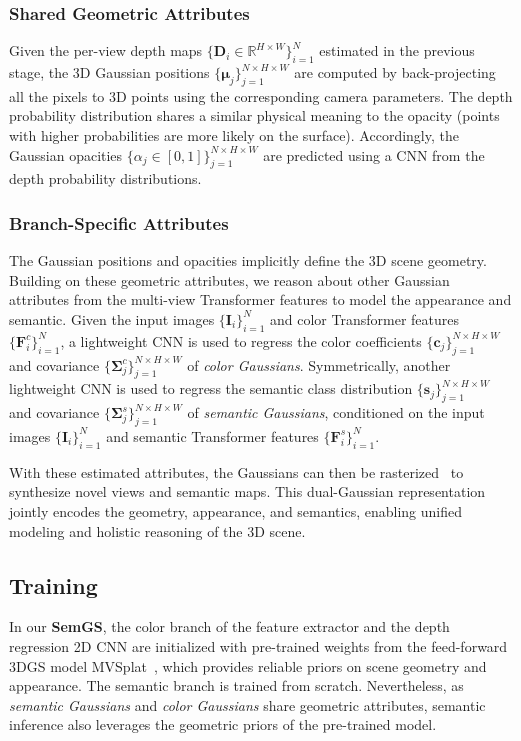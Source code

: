 \documentclass[letterpaper, 10 pt, conference]{ieeeconf}  %
\begin{document}
\subsubsection{Shared Geometric Attributes}
Given the per-view depth maps $\{\mathbf{D}_i \in \mathbb{R}^{H \times W} \}_{i=1}^N$ estimated in the previous stage, the 3D Gaussian positions $\{\bm{\mu}_j\}_{j=1}^{N \times H \times W}$ are computed by back-projecting all the pixels to 3D points using the corresponding camera parameters.
The depth probability distribution shares a similar physical meaning to the opacity (points with higher probabilities are more likely on the surface). Accordingly, the Gaussian opacities $\{\alpha_j \in [0,1]\}_{j=1}^{N \times H \times W}$ are predicted using a CNN from the depth probability distributions.

\subsubsection{Branch-Specific Attributes}
The Gaussian positions and opacities implicitly define the 3D scene geometry. Building on these geometric attributes, we reason about other Gaussian attributes from the multi-view Transformer features to model the appearance and semantic.
Given the input images $\{\mathbf{I}_i\}_{i=1}^N$ and color Transformer features $\{\mathbf{F}^c_i\}_{i=1}^N$, a lightweight CNN is used to regress the color coefficients $\{\mathbf{c}_j\}_{j=1}^{N \times H \times W}$ and covariance $\{\mathbf{\Sigma}^c_j\}_{j=1}^{N \times H \times W}$ of \textit{color Gaussians}.
Symmetrically, another lightweight CNN is used to regress the semantic class distribution $\{\mathbf{s}_j\}_{j=1}^{N \times H \times W}$ and covariance $\{\mathbf{\Sigma}^s_j\}_{j=1}^{N \times H \times W}$ of \textit{semantic Gaussians}, conditioned on the input images $\{\mathbf{I}_i\}_{i=1}^N$ and semantic Transformer features $\{\mathbf{F}^s_i\}_{i=1}^N$.

With these estimated attributes, the Gaussians can then be rasterized~\cite{3dgs} to synthesize novel views and semantic maps.
This dual-Gaussian representation jointly encodes the geometry, appearance, and semantics, enabling unified modeling and holistic reasoning of the 3D scene.

\subsection{Training}
In our \textbf{SemGS}, the color branch of the feature extractor and the depth regression 2D CNN are initialized with pre-trained weights from the feed-forward 3DGS model MVSplat~\cite{mvsplat}, which provides reliable priors on scene geometry and appearance. The semantic branch is trained from scratch. Nevertheless, as \textit{semantic Gaussians} and \textit{color Gaussians} share geometric attributes, semantic inference also leverages the geometric priors of the pre-trained model.
\end{document}
